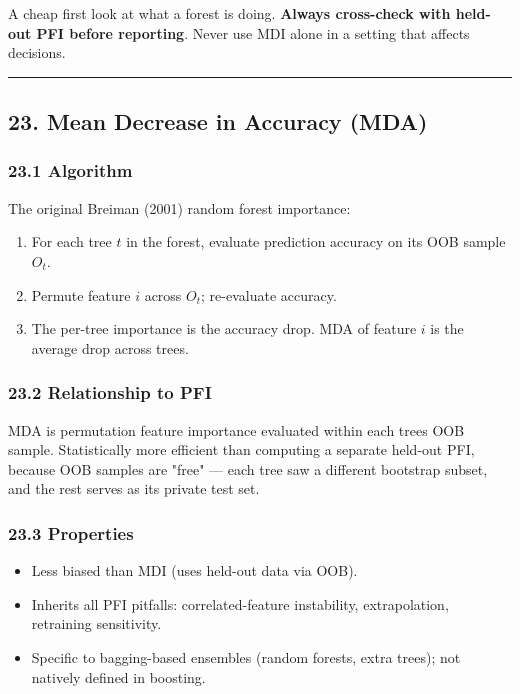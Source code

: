 \documentclass{article}
\providecommand{\tightlist}{\setlength{\itemsep}{0pt}\setlength{\parskip}{0pt}}
\begin{document}
A cheap first look at what a forest is doing. \textbf{Always cross-check
with held-out PFI before reporting}. Never use MDI alone in a setting
that affects decisions.

\begin{center}\rule{0.5\linewidth}{0.5pt}\end{center}

\subsection{23. Mean Decrease in Accuracy
(MDA)}\label{23-mean-decrease-in-accuracy-mda}

\subsubsection{23.1 Algorithm}\label{231-algorithm}

The original Breiman (2001) random forest importance:

\begin{enumerate}
\def\labelenumi{\arabic{enumi}.}
\tightlist
\item
  For each tree \(t\) in the forest, evaluate prediction accuracy on its
  OOB sample \(O_t\).
\item
  Permute feature \(i\) across \(O_t\); re-evaluate accuracy.
\item
  The per-tree importance is the accuracy drop. MDA of feature \(i\) is
  the average drop across trees.
\end{enumerate}

\subsubsection{23.2 Relationship to PFI}\label{232-relationship-to-pfi}

MDA is permutation feature importance evaluated within each
tree\textquotesingle s OOB sample. Statistically more efficient than
computing a separate held-out PFI, because OOB samples are "free" ---
each tree saw a different bootstrap subset, and the rest serves as its
private test set.

\subsubsection{23.3 Properties}\label{233-properties}

\begin{itemize}
\tightlist
\item
  Less biased than MDI (uses held-out data via OOB).
\item
  Inherits all PFI pitfalls: correlated-feature instability,
  extrapolation, retraining sensitivity.
\item
  Specific to bagging-based ensembles (random forests, extra trees); not
  natively defined in boosting.
\end{itemize}
\end{document}
